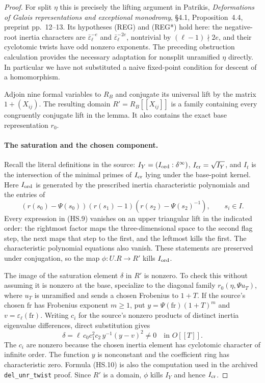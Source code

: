 \begin{proof}
For split $\eta$ this is precisely the lifting argument in
Patrikis, \emph{Deformations of Galois representations and
exceptional monodromy}, \S4.1, Proposition~4.4, preprint
pp.~12--13.  Its hypotheses \textnormal{(REG)} and
\textnormal{(REG*)} hold here: the negative-root inertia
characters are $\bar\varepsilon_\ell^{-e}$ and
$\bar\varepsilon_\ell^{-2e}$, nontrivial by
$(\ell-1)\nmid2e$, and their cyclotomic twists have odd
nonzero exponents.  The preceding obstruction calculation
provides the necessary adaptation for nonsplit unramified
$\eta$ directly.  In particular we have not substituted a
naive fixed-point condition for descent of a homomorphism.

Adjoin nine formal variables to $R_B$ and conjugate its
universal lift by the matrix $1+(X_{ij})$.  The resulting
domain $R'=R_B[[X_{ij}]]$ is a family containing every
congruently conjugate lift in the lemma.  It also contains
the exact base representation $r_0$.

\paragraph{The saturation and the chosen component.}
Recall the literal definitions in the source:
$I_Y=(I_{\rm ord}:\delta^\infty)$,
$I_{\rm cr}=\sqrt{I_Y}$, and $I_t$ is the intersection of
the minimal primes of $I_{\rm cr}$ lying under the base-point
kernel.  Here $I_{\rm ord}$ is generated by the prescribed
inertia characteristic polynomials and the entries of
\[
 (r(s_0)-\Psi(s_0))
 (r(s_1)-1)
 (r(s_2)-\Psi(s_2)^{-1}),\qquad s_i\in I.                   \tag{HS.9}
\]
Every expression in (HS.9) vanishes on an upper triangular
lift in the indicated order: the rightmost factor maps the
three-dimensional space to the second flag step, the next
maps that step to the first, and the leftmost kills the first.
The characteristic polynomial equations also vanish.  These
statements are preserved under conjugation, so the map
$\phi:U.R\to R'$ kills $I_{\rm ord}$.

The image of the saturation element $\delta$ in $R'$ is
nonzero.  To check this without assuming it is nonzero at
the base, specialize to the diagonal family
$r_0(\eta,\Psi u_T)$, where $u_T$ is unramified and sends
a chosen Frobenius to $1+T$.  If the source's chosen
$\mathrm{fr}$ has Frobenius exponent $m\geq1$, put
$y=\Psi(\mathrm{fr})(1+T)^m$ and
$v=\varepsilon_\ell(\mathrm{fr})$.  Writing $c_i$ for the
source's nonzero products of distinct inertia eigenvalue
differences, direct substitution gives
\[
 \delta=\ell\,c_0c_1^2c_2\,y^{-1}(y-v)^2\ne0
                                  \quad\text{in }O[[T]].     \tag{HS.10}
\]
The $c_i$ are nonzero because the chosen inertia element has
cyclotomic character of infinite order.  The function $y$ is
nonconstant and the coefficient ring has characteristic zero.
Formula (HS.10) is also the computation used in the archived
\texttt{del\_unr\_twist} proof.  Since $R'$ is a domain,
$\phi$ kills $I_Y$ and hence $I_{\rm cr}$.


\end{proof}
